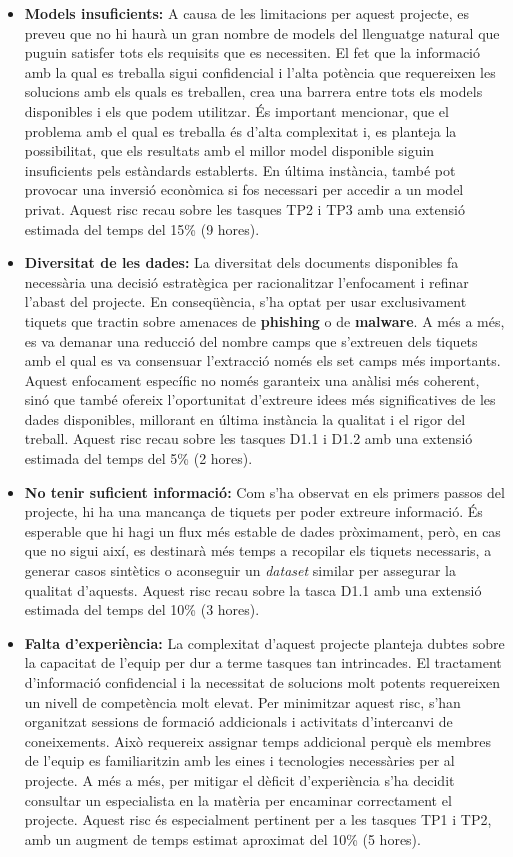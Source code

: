 \begin{itemize}
    \item \textbf{Models insuficients:} A causa de les limitacions per aquest projecte, es preveu que no hi haurà un gran nombre de models del llenguatge natural que puguin satisfer tots els requisits que es necessiten. El fet que la informació amb la qual es treballa sigui confidencial i l'alta potència que requereixen les solucions amb els quals es treballen, crea una barrera entre tots els models disponibles i els que podem utilitzar. És important mencionar, que el problema amb el qual es treballa és d'alta complexitat i, es planteja la possibilitat, que els resultats amb el millor model disponible siguin insuficients pels estàndards establerts. En última instància, també pot provocar una inversió econòmica si fos necessari per accedir a un model privat. Aquest risc recau sobre les tasques TP2 i TP3 amb una extensió estimada del temps del 15\% (9 hores).
    \item \textbf{Diversitat de les dades:} La diversitat dels documents disponibles fa necessària una decisió estratègica per racionalitzar l'enfocament i refinar l'abast del projecte. En conseqüència, s'ha optat per usar exclusivament tiquets que tractin sobre amenaces de \textbf{phishing} o de \textbf{malware}. A més a més, es va demanar una reducció del nombre camps que s'extreuen dels tiquets amb el qual es va consensuar l'extracció només els set camps més importants. Aquest enfocament específic no només garanteix una anàlisi més coherent, sinó que també ofereix l'oportunitat d'extreure idees més significatives de les dades disponibles, millorant en última instància la qualitat i el rigor del treball. Aquest risc recau sobre les tasques D1.1 i D1.2 amb una extensió estimada del temps del 5\% (2 hores).
    \item \textbf{No tenir suficient informació:} Com s'ha observat en els primers passos del projecte, hi ha una mancança de tiquets per poder extreure informació. És esperable que hi hagi un flux més estable de dades pròximament, però, en cas que no sigui així, es destinarà més temps a recopilar els tiquets necessaris, a generar casos sintètics o aconseguir un \textit{dataset} similar per assegurar la qualitat d'aquests. Aquest risc recau sobre la tasca D1.1 amb una extensió estimada del temps del 10\% (3 hores).
    \item \textbf{Falta d'experiència:} La complexitat d'aquest projecte planteja dubtes sobre la capacitat de l'equip per dur a terme tasques tan intrincades. El tractament d'informació confidencial i la necessitat de solucions molt potents requereixen un nivell de competència molt elevat. Per minimitzar aquest risc, s'han organitzat sessions de formació addicionals i activitats d'intercanvi de coneixements. Això requereix assignar temps addicional perquè els membres de l'equip es familiaritzin amb les eines i tecnologies necessàries per al projecte. A més a més, per mitigar el dèficit d'experiència s'ha decidit consultar un especialista en la matèria per encaminar correctament el projecte. Aquest risc és especialment pertinent per a les tasques TP1 i TP2, amb un augment de temps estimat aproximat del 10\% (5 hores).
\end{itemize}
